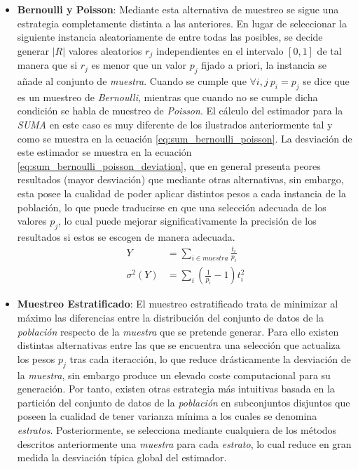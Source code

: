 \documentclass{subfiles}
\begin{document}
\begin{itemize}
          \item \textbf{Bernoulli y Poisson}: Mediante esta alternativa de muestreo se sigue una estrategia completamente distinta a las anteriores. En lugar de seleccionar la siguiente instancia aleatoriamente de entre todas las posibles, se decide generar $|R|$ valores aleatorios $r_j$ independientes en el intervalo $[0,1]$ de tal manera que si $r_j$ es menor que un valor $p_j$ fijado a priori, la instancia se añade al conjunto de \emph{muestra}. Cuando se cumple que $\forall i, j \ p_i = p_j$ se dice que es un muestreo de \emph{Bernoulli}, mientras que cuando no se cumple dicha condición se habla de muestreo de \emph{Poisson}. El cálculo del estimador para la \emph{SUMA} en este caso es muy diferente de los ilustrados anteriormente tal y como se muestra en la ecuación \eqref{eq:sum_bernoulli_poisson}. La desviación de este estimador se muestra en la ecuación \eqref{eq:sum_bernoulli_poisson_deviation}, que en general presenta peores resultados (mayor desviación) que mediante otras alternativas, sin embargo, esta posee la cualidad de poder aplicar distintos pesos a cada instancia de la población, lo que puede traducirse en que una selección adecuada de los valores $p_j$, lo cual puede mejorar significativamente la precisión de los resultados si estos se escogen de manera adecuada.
            \begin{align}
            \label{eq:sum_bernoulli_poisson}
              Y &= \sum_{i \in muestra }\frac{t_i}{p_i} \\
            \label{eq:sum_bernoulli_poisson_deviation}
              \sigma^2(Y) &= \sum_i(\frac{1}{p_i}-1)t_i^2
            \end{align}

          \item \textbf{Muestreo Estratificado}: El muestreo estratificado trata de minimizar al máximo las diferencias entre la distribución del conjunto de datos de la \emph{población} respecto de la \emph{muestra} que se pretende generar. Para ello existen distintas alternativas entre las que se encuentra una selección que  actualiza los pesos $p_j$ tras cada iteracción, lo que reduce drásticamente la desviación de la \emph{muestra}, sin embargo produce un elevado coste computacional para su generación. Por tanto, existen otras estrategia más intuitivas basada en la partición del conjunto de datos de la \emph{población} en subconjuntos disjuntos que poseen la cualidad de tener varianza mínima a los cuales se denomina \emph{estratos}. Posteriormente, se selecciona mediante cualquiera de los métodos descritos anteriormente una \emph{muestra} para cada \emph{estrato}, lo cual reduce en gran medida la desviación típica global del estimador.

        \end{itemize}
\end{document}
